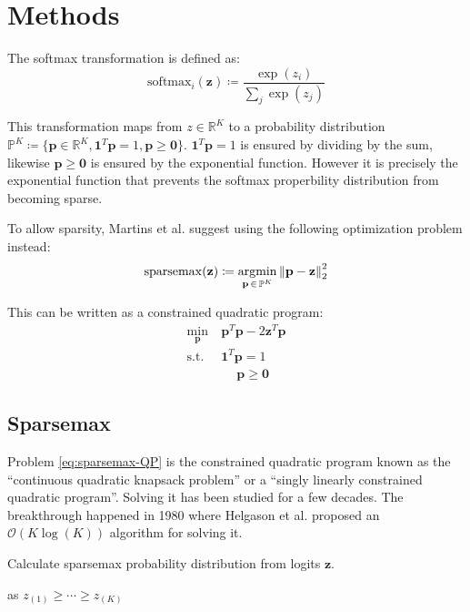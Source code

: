 \section{Methods}

The softmax transformation is defined as:
\begin{equation}
\mathrm{softmax}_i(\mathbf{z}) \coloneqq \frac{\exp(z_i)}{\sum_{j} \exp(z_j)}
\end{equation}

This transformation maps from $z \in \mathbb{R}^K$ to a probability distribution $\mathbb{P}^K \coloneqq \{ \mathbf{p} \in \mathbb{R}^K,  \mathbf{1}^T \mathbf{p} = 1, \mathbf{p} \ge \mathbf{0} \}$. $\mathbf{1}^T \mathbf{p} = 1$ is ensured by dividing by the sum, likewise $\mathbf{p} \ge \mathbf{0}$ is ensured by the exponential function. However it is precisely the exponential function that prevents the softmax properbility distribution from becoming sparse.

To allow sparsity, Martins et al. \cite{sparsemax} suggest  using the following optimization problem instead:
\begin{equation}
\mathrm{sparsemax}(\mathbf{z}) \coloneqq \operatorname*{argmin}_{\mathbf{p}\, \in\, \mathbb{P}^K} \left\lVert \mathbf{p} - \mathbf{z} \right\rVert_2^2 
\end{equation}

This can be written as a constrained quadratic program:
\begin{equation}
\begin{aligned}
\min_{\mathbf{p}}\ &\mathbf{p}^T \mathbf{p} - 2 \mathbf{z}^T \mathbf{p} \\
\text{s.t. } &\mathbf{1}^T \mathbf{p} = 1 \\
&\quad\ \mathbf{p} \ge \mathbf{0}
\end{aligned}
\label{eq:sparsemax-QP}
\end{equation}

\subsection{Sparsemax}
Problem \eqref{eq:sparsemax-QP} is the constrained quadratic program known as the ``continuous quadratic knapsack problem'' or a ``singly linearly constrained quadratic program''. Solving it has been studied for a few decades. The breakthrough happened in 1980 where Helgason et al. \cite{Helgason1980} proposed an $\mathcal{O}(K \log(K))$ algorithm for solving it.
\begin{algorithm}[H]
  \caption{Calculate sparsemax probability distribution from logits $\mathbf{z}$.}
  \begin{algorithmic}[1]
      \State {} as $z_{(1)} \ge \cdots \ge z_{(K)}$
      \State {}
    \EndFunction
  \end{algorithmic}
\end{algorithm}

